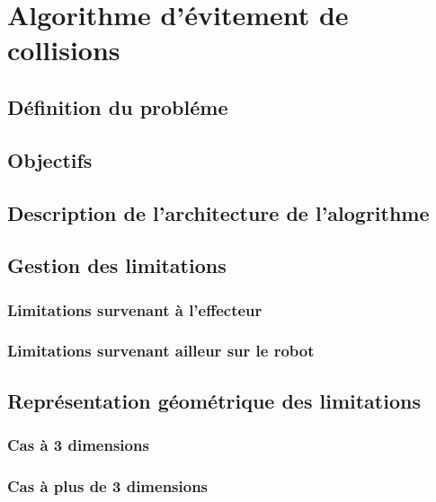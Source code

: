 \chapter{Algorithme d'évitement de collisions}     %

\section{Définition du probléme}
\section{Objectifs}
\section{Description de l'architecture de l'alogrithme}
\section{Gestion des limitations}
\subsection{Limitations survenant à l'effecteur}
\subsection{Limitations survenant ailleur sur le robot}
\section{Représentation géométrique des limitations}
\subsection{Cas à 3 dimensions}
\subsection{Cas à plus de 3 dimensions}
